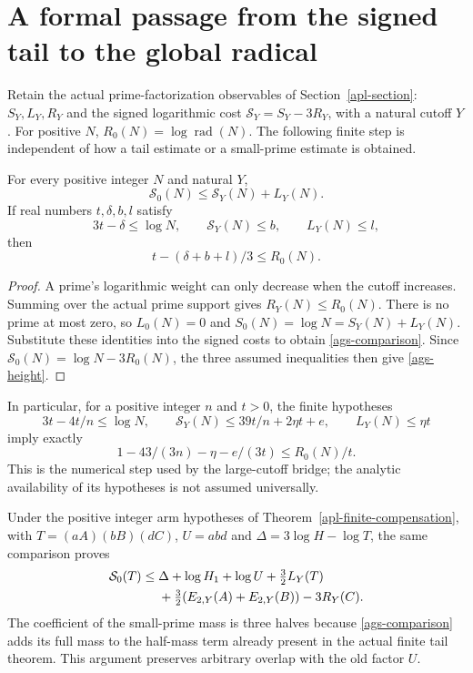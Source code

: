 \section{A formal passage from the signed tail to the global radical}
\label{ags-section}

Retain the actual prime-factorization observables of
Section~\ref{apl-section}: $S_Y,L_Y,R_Y$ and the signed logarithmic
cost $\mathcal S_Y=S_Y-3R_Y$, with a natural cutoff $Y$.
For positive $N$, $R_0(N)=\log\operatorname{rad}(N)$.
The following finite step is independent of how a tail estimate
or a small-prime estimate is obtained.

\begin{lemma}\label{ags-global}
For every positive integer $N$ and natural $Y$,
\begin{equation}\label{ags-comparison}
 \mathcal S_0(N)\le\mathcal S_Y(N)+L_Y(N).
\end{equation}
If real numbers $t,\delta,b,l$ satisfy
\[
 3t-\delta\le\log N,\qquad
 \mathcal S_Y(N)\le b,\qquad L_Y(N)\le l,
\]
then
\begin{equation}\label{ags-height}
 t-(\delta+b+l)/3\le R_0(N).
\end{equation}
\end{lemma}
\begin{proof}
A prime's logarithmic weight can only decrease when the cutoff
increases. Summing over the actual prime support gives $R_Y(N)\le R_0(N)$.
There is no prime at most zero, so $L_0(N)=0$ and
$S_0(N)=\log N=S_Y(N)+L_Y(N)$. Substitute these identities into
the signed costs to obtain \eqref{ags-comparison}. Since
$\mathcal S_0(N)=\log N-3R_0(N)$, the three assumed inequalities
then give \eqref{ags-height}.
\end{proof}

In particular, for a positive integer $n$ and $t>0$, the finite
hypotheses
\[
 3t-4t/n\le\log N,\qquad
 \mathcal S_Y(N)\le39t/n+2\eta t+e,\qquad
 L_Y(N)\le\eta t
\]
imply exactly
\begin{equation}\label{ags-numerical}
 1-43/(3n)-\eta-e/(3t)\le R_0(N)/t.
\end{equation}
This is the numerical step used by the large-cutoff bridge; the
analytic availability of its hypotheses is not assumed universally.

Under the positive integer arm hypotheses of
Theorem~\ref{apl-finite-compensation}, with $T=(aA)(bB)(dC)$,
$U=abd$ and $\Delta=3\log H-\log T$, the same comparison proves
\begin{align}
 \mathcal S_0(T)\le{}&\Delta+\log H_1+\log U+\tfrac32 L_Y(T)
 \label{ags-arm}\\
 &+\tfrac32(E_{2,Y}(A)+E_{2,Y}(B))-3R_Y(C).\notag
\end{align}
The coefficient of the small-prime mass is three halves because
\eqref{ags-comparison} adds its full mass to the half-mass term
already present in the actual finite tail theorem. This argument
preserves arbitrary overlap with the old factor $U$.

